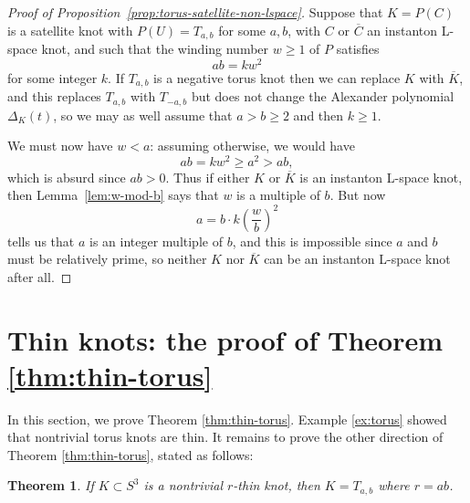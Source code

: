 \documentclass[11pt]{amsart}
\newtheorem {theorem}{Theorem}
\numberwithin{equation}{section}
\numberwithin{theorem}{section}
\theoremstyle{definition}
\newcommand{\mirror}[1]{\overline{#1}}
\begin{document}
\begin{proof}[Proof of Proposition~\ref{prop:torus-satellite-non-lspace}]
Suppose that $K = P(C)$ is a satellite knot with $P(U) = T_{a,b}$ for some $a,b$, with $C$ or $\mirror{C}$ an instanton L-space knot, and such that the winding number $w \geq 1$ of $P$ satisfies
\[ ab = kw^2 \]
for some integer $k$.  If $T_{a,b}$ is a negative torus knot then we can replace $K$ with $\mirror{K}$, and this replaces $T_{a,b}$ with $T_{-a,b}$ but does not change the Alexander polynomial $\Delta_K(t)$, so we may as well assume that $a > b \geq 2$ and then $k \geq 1$.

We must now have $w < a$: assuming otherwise, we would have
\[ ab = kw^2 \geq a^2 > ab, \]
which is absurd since $ab > 0$.  Thus if either $K$ or $\mirror{K}$ is an instanton L-space knot, then Lemma~\ref{lem:w-mod-b} says that $w$ is a multiple of $b$.  But now
\[ a = b \cdot k\left(\frac{w}{b}\right)^2 \]
tells us that $a$ is an integer multiple of $b$, and this is impossible since $a$ and $b$ must be relatively prime, so neither $K$ nor $\mirror{K}$ can be an instanton L-space knot after all.
\end{proof}

%
%
%
%
%

\section{Thin knots: the proof of Theorem \ref{thm:thin-torus}}
\label{sec:thin}

In this section, we prove Theorem \ref{thm:thin-torus}. Example \ref{ex:torus} showed that nontrivial torus knots are thin.  It remains to prove the other direction of Theorem \ref{thm:thin-torus}, stated  as follows:

\begin{theorem} \label{thm:thin-torus-proof}
If $K \subset S^3$ is a nontrivial $r$-thin knot, then $K=T_{a,b}$ where $r=ab$.
\end{theorem}
\end{document}
